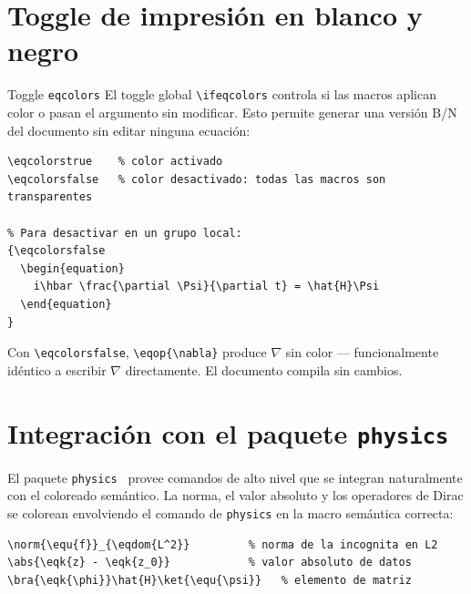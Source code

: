 \section{Toggle de impresión en blanco y negro}
\label{sec:toggle-bn}

\begin{definicion}{Toggle \texttt{eqcolors}}
\label{def:toggle}
El toggle global \texttt{\textbackslash ifeqcolors} controla si las macros
aplican color o pasan el argumento sin modificar. Esto permite generar una
versión B/N del documento sin editar ninguna ecuación:
\end{definicion}

\begin{lstlisting}[style=latex, frame=none, numbers=none]
% En config/equations.tex (activo por defecto):
\eqcolorstrue    % color activado
\eqcolorsfalse   % color desactivado: todas las macros son transparentes

% Para desactivar en un grupo local:
{\eqcolorsfalse
  \begin{equation}
    i\hbar \frac{\partial \Psi}{\partial t} = \hat{H}\Psi
  \end{equation}
}
\end{lstlisting}

Con \texttt{\textbackslash eqcolorsfalse}, \texttt{\textbackslash eqop\{\textbackslash nabla\}}
produce $\nabla$ sin color --- funcionalmente idéntico a escribir
$\nabla$ directamente. El documento compila sin cambios.

\section{Integración con el paquete \texttt{physics}}
\label{sec:physics-pkg}

El paquete \texttt{physics}~\cite{physics-pkg} provee comandos de alto nivel
que se integran naturalmente con el coloreado semántico. La norma, el valor
absoluto y los operadores de Dirac se colorean envolviendo el comando de
\texttt{physics} en la macro semántica correcta:

\begin{lstlisting}[style=latex, frame=none, numbers=none]
\norm{\equ{f}}_{\eqdom{L^2}}         % norma de la incognita en L2
\abs{\eqk{z} - \eqk{z_0}}            % valor absoluto de datos
\bra{\eqk{\phi}}\hat{H}\ket{\equ{\psi}}   % elemento de matriz
\end{lstlisting}

